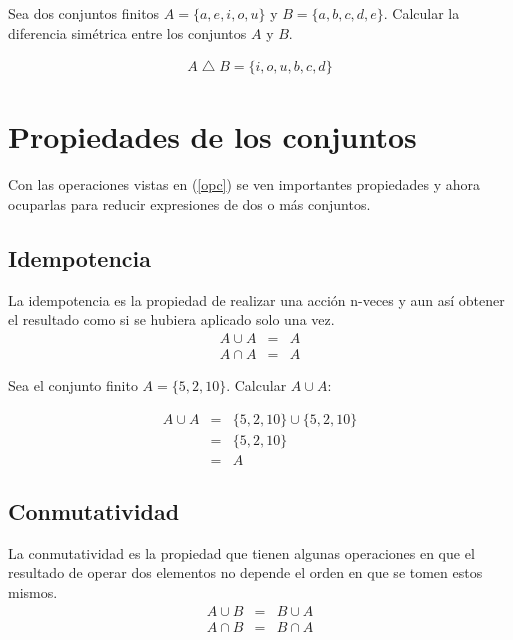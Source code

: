 \begin{myexample}
Sea dos conjuntos finitos $A=\{a,e,i,o,u\}$ y $B=\{a,b,c,d,e\}$. Calcular la diferencia simétrica entre los conjuntos $A$ y $B$.
\end{myexample}
\begin{eqnarray*}
A\bigtriangleup B =\{i,o,u,b,c,d\}
\end{eqnarray*}

\section{Propiedades de los conjuntos}
Con las operaciones vistas en (\ref{opc}) se ven importantes propiedades y ahora ocuparlas para reducir expresiones de dos o más conjuntos.

\subsection{Idempotencia}
La idempotencia es la propiedad de realizar una acción n-veces y aun así obtener el resultado como si se hubiera aplicado solo una vez.\\
\begin{eqnarray}
A\cup A&=& A\\
A\cap A&=& A
\end{eqnarray}

\begin{myexample}
Sea el conjunto finito $A=\{5,2,10\}$. Calcular $A\cup A$: 
\end{myexample}
\begin{eqnarray*}
A\cup A&=& \{5,2,10\}\cup\{5,2,10\} \nonumber\\
&=&\{5,2,10\} \\
&=&A
\end{eqnarray*}

%
%

\subsection{Conmutatividad}
La conmutatividad es la propiedad que tienen algunas operaciones en que el resultado de operar dos elementos no depende el orden en que se tomen estos mismos.\\
\begin{eqnarray}
A\cup B&=&B\cup A\\
A\cap B&=&B\cap A
\end{eqnarray}

